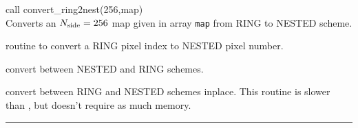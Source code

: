 \begin{example}
{
call convert\_ring2nest(256,map)  \\
}
{
Converts an ${N_{\rm side}}=256$ map given in array {\tt map} from RING to NESTED scheme.
}
\end{example}

\begin{modules}
  \begin{sulist}{} %
 \item[\htmlref{ring2nest}{sub:pix_tools}] routine to convert a RING pixel index to NESTED pixel number.		
  \end{sulist}
\end{modules}
\begin{related}
  \begin{sulist}{} %
  \item[\htmlref{convert\_nest2ring}{sub:convert_ring2nest}] convert between
  NESTED and RING schemes.
  \item[\htmlref{convert\_inplace}{sub:convert_inplace}] convert between 
    RING and NESTED schemes inplace. This routine is slower than \thedocid, but doesn't require as much memory.
  \end{sulist}
\end{related}

\rule{\hsize}{2mm}

\newpage
